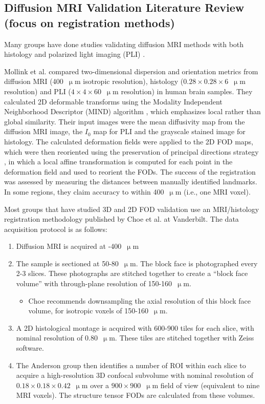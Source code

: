 \documentclass[11pt]{article}
\begin{document}
\subsection{Diffusion MRI Validation Literature Review (focus on registration methods)}
Many groups have done studies validating diffusion MRI methods with both
histology \cite{Schilling2016, Schilling2018, Seehaus2015} and polarized light
imaging (PLI) \cite{Mollink2017}.

Mollink et al. \cite{Mollink2017} compared two-dimensional dispersion and
orientation metrics from diffusion MRI (400~$\upmu$m isotropic resolution),
histology ($0.28\times0.28\times6$~$\upmu$m resolution) and PLI
($4\times4\times60$~$\upmu$m resolution) in human brain samples. They calculated
2D deformable transforms using the Modality Independent Neighborhood Descriptor
(MIND) algorithm \cite{Heinrich2012}, which emphasizes local rather than global
similarity. Their input images were the mean diffusivity map from the diffusion
MRI image, the $I_0$ map for PLI and the grayscale stained image for histology.
The calculated deformation fields were applied to the 2D FOD maps, which were
then reoriented using the preservation of principal directions strategy
\cite{Alexander2001}, in which a local affine transformation is computed for
each point in the deformation field and used to reorient the FODs. The success
of the registration was assessed by measuring the distances between manually
identified landmarks. In some regions, they claim accuracy to within 400~$\upmu$m
(i.e., one MRI voxel).

Most groups that have studied 3D \cite{Schilling2016, Schilling2018} and 2D
\cite{Seehaus2015} FOD validation use an MRI/histology registration methodology
published by Choe et al. \cite{Choe2011} at Vanderbilt. The data acquisition protocol is as
follows:
\begin{enumerate}
\item Diffusion MRI is acquired at -400~$\upmu$m
\item The sample is sectioned at 50-80~$\upmu$m. The block face
  is photographed every 2-3 slices. These photographs are
  stitched together to create a ``block face volume'' with
  through-plane resolution of 150-160~$\upmu$m.
  \begin{itemize}
  \item Choe \cite{Choe2011} recommends downsampling the axial resolution of
    this block face volume, for isotropic voxels of 150-160~$\upmu$m. 
  \end{itemize}
\item A 2D histological montage is acquired with 600-900 tiles for each slice,
  with nominal resolution of 0.80~$\upmu$m. These tiles are stitched together
  with Zeiss software.
\item The Anderson group \cite{Schilling2016, Schilling2018} then identifies a
  number of ROI within each slice to acquire a high-resolution 3D confocal
  subvolume with nominal resolution of $0.18\times0.18\times0.42$~$\upmu$m over
  a $900\times900$~$\upmu$m field of view (equivalent to nine MRI voxels).
  The structure tensor FODs are calculated from these volumes. 
\end{enumerate}
\end{document}
